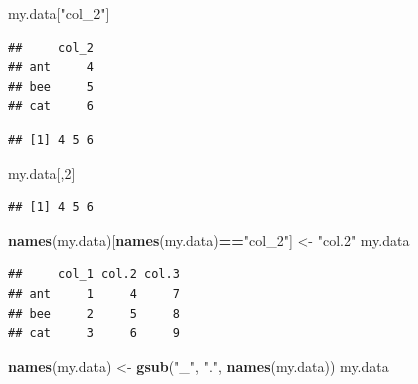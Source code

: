 \documentclass[]{book}
\newenvironment{Shaded}{\begin{snugshade}}{\end{snugshade}}
\newcommand{\DecValTok}[1]{\textcolor[rgb]{0.00,0.00,0.81}{#1}}
\newcommand{\KeywordTok}[1]{\textcolor[rgb]{0.13,0.29,0.53}{\textbf{#1}}}
\newcommand{\NormalTok}[1]{#1}
\newcommand{\OperatorTok}[1]{\textcolor[rgb]{0.81,0.36,0.00}{\textbf{#1}}}
\newcommand{\StringTok}[1]{\textcolor[rgb]{0.31,0.60,0.02}{#1}}
\begin{document}
\begin{Shaded}
\begin{Highlighting}[]
\NormalTok{my.data[}\StringTok{"col_2"}\NormalTok{]}
\end{Highlighting}
\end{Shaded}

\begin{verbatim}
##     col_2
## ant     4
## bee     5
## cat     6
\end{verbatim}

\begin{Shaded}
\end{Shaded}

\begin{verbatim}
## [1] 4 5 6
\end{verbatim}

\begin{Shaded}
\begin{Highlighting}[]
\NormalTok{my.data[,}\DecValTok{2}\NormalTok{]}
\end{Highlighting}
\end{Shaded}

\begin{verbatim}
## [1] 4 5 6
\end{verbatim}

\begin{Shaded}
\begin{Highlighting}[]
\KeywordTok{names}\NormalTok{(my.data)[}\KeywordTok{names}\NormalTok{(my.data)}\OperatorTok{==}\StringTok{"col_2"}\NormalTok{] <-}\StringTok{ "col.2"}
\NormalTok{my.data}
\end{Highlighting}
\end{Shaded}

\begin{verbatim}
##     col_1 col.2 col.3
## ant     1     4     7
## bee     2     5     8
## cat     3     6     9
\end{verbatim}

\begin{Shaded}
\begin{Highlighting}[]
\KeywordTok{names}\NormalTok{(my.data) <-}\StringTok{ }\KeywordTok{gsub}\NormalTok{(}\StringTok{"_"}\NormalTok{, }\StringTok{"."}\NormalTok{, }\KeywordTok{names}\NormalTok{(my.data))}
\NormalTok{my.data}
\end{Highlighting}
\end{Shaded}
\end{document}
